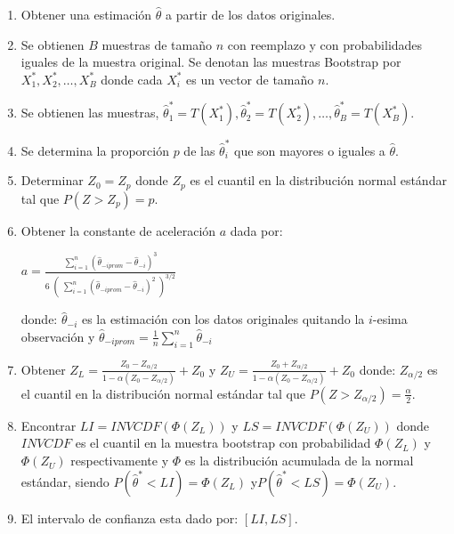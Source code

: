 \begin{enumerate}
 \item Obtener una estimación $\hat{\theta}$ a partir de los datos originales.
 
\item Se obtienen $B$ muestras de tamaño $n$ con reemplazo y con probabilidades iguales de la muestra original. Se denotan las muestras Bootstrap por $X^{*}_{1}, X^{*}_{2},  \dots, X^{*}_{B}$ donde cada $X^{*}_{i}$ es un vector de tamaño $n$.

\item Se obtienen las muestras, $\hat{\theta}^{*}_{1} = T (X^{*}_{1}) , \hat{\theta}^{*}_{2} = T (X^{*}_{2}), \dots,\hat{\theta}^{*}_{B} = T (X^{*}_{B})$.

\item Se determina la proporción $p$ de las  $\hat{\theta}^{*}_{i}$ que son mayores o iguales a $\hat{\theta}$.

\item  Determinar $Z_{0} = Z_{p}$ donde $Z_{p}$ es el cuantil en la distribución normal estándar tal que $P(Z > Z_{p}) = p$.

\item  Obtener la constante de aceleración $a$ dada por:
\begin{center}
 \Large $ a = \frac{\sum_{i=1}^{n}  (\hat{\theta}_{-iprom}  - \hat{\theta}_{-i})^{3} }{ 6 \; (\; \sum_{i=1}^{n}  ( \hat{\theta}_{-iprom}  - \hat{\theta}_{-i})^{2} \; )^{3/2}} $
\end{center}

 donde: $\hat{\theta}_{-i}$ es la estimación con los datos originales quitando la $i$-esima observación y {\normalsize $\hat{\theta}_{-iprom} = \frac{1}{n} \sum_{i=1}^{n}\hat{\theta}_{-i}$}
 
 \item Obtener {\large $Z_{L} = \frac{Z_{0} - Z_{\alpha/2}}{ 1- \alpha ( Z_{0} - Z_{\alpha/2})} + Z_{0}  $}   y {\large $Z_{U} = \frac{Z_{0} + Z_{\alpha/2}}{ 1- \alpha ( Z_{0} - Z_{\alpha/2})} + Z_{0}  $}  donde: $Z_{\alpha /2}$ es el cuantil en la
 distribución normal estándar tal que $P(Z > Z_{\alpha / 2}) = \frac{\alpha}{2}$.
 
 
 \item Encontrar $LI = INVCDF( \Phi(Z_{L}))$ y $LS = INVCDF( \Phi(Z_{U}))$ donde $INVCDF$ es el cuantil en la muestra bootstrap con probabilidad $ \Phi(Z_{L})$ y $ \Phi(Z_{U})$ respectivamente y $\Phi$ es la distribución acumulada de la normal estándar, siendo $P(\hat{\theta}^{*} < LI) = \Phi(Z_{L})$ y$P(\hat{\theta}^{*} < LS) = \Phi(Z_{U})$.
 
\item El intervalo de confianza esta dado por: $[LI, LS]$.
\end{enumerate}


